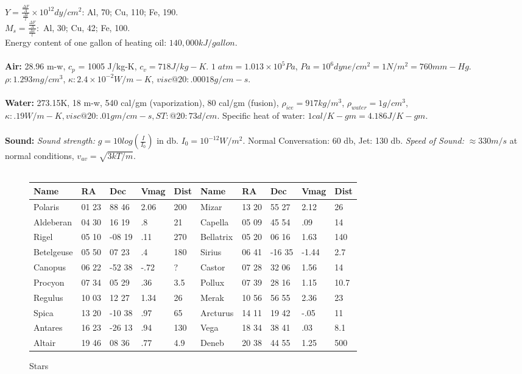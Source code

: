 $Y= {\frac {\frac {\Delta F}{A}} {\frac {\Delta l}{l}}} \times
10^{12} dy/cm^{2}$: Al, 70; Cu, 110; Fe, 190.  \\
$M_{s} = {\frac {\frac {\Delta F} {A}} {\frac {\Delta x} {l}}}:$
Al, 30; Cu, 42; Fe, 100.\\
Energy content of one gallon of heating oil: $140,000 kJ/gallon$.
\\
\\
{\bf Air:} 28.96 m-w, $c_{p}$ = 1005 J/kg-K, $c_{v} = 718 J/kg-K$.
$1\; atm= 1.013 \times 10^{5} Pa$, $Pa= 10^{6} dyne/cm^{2}= 1N/m^2=760 mm-Hg$.
$\rho: 1.293 mg/cm^{3}$, $\kappa :  2.4 \times 10^{-2} W/m-K$, $visc@20: .00018 g/cm-s.$
\\
\\
{\bf Water:} 273.15K, 18 m-w, 540 cal/gm (vaporization), 80 cal/gm (fusion),
$\rho_{ice} = 917 kg / m^{3}$,
$\rho_{water} = 1 g / cm^{3}$,
$\kappa:  .19 W/m-K, visc@20: .01gm/cm-s, ST: @20: 73d/cm.$  Specific
heat of water: $1 cal/K-gm= 4.186 J/K-gm$.
\\
\\
{\bf Sound:}
\emph{Sound strength:} $g= 10 log({\frac {I} {I_0}})$ in db.  $I_0 = 10^{-12}
W/m^2$. Normal Conversation: 60 db, Jet: 130 db.
\emph{Speed of Sound:}
$\approx 330 m/s$ at normal conditions,
$v_{av} = {\sqrt { {3 k T } / m }}$.
\\
\\
\begin{figure} [h]
\begin{center}
\begin{tabular} {|lllll|lllll|}
\hline
{\bf Name} & {\bf RA} & {\bf Dec} & {\bf Vmag} & {\bf Dist} & {\bf Name} & {\bf RA} & {\bf Dec} & {\bf Vmag} & {\bf Dist} \\
\hline
Polaris & 01 23 & 88 46 & 2.06 & 200 & Mizar & 13 20 & 55 27 & 2.12 & 26 \\
\hline
Aldeberan & 04 30 & 16 19 & .8 & 21 & Capella & 05 09 & 45 54 & .09 & 14 \\
\hline
Rigel & 05 10 & -08 19 & .11 & 270 & Bellatrix & 05 20 & 06 16 & 1.63 & 140 \\
\hline
Betelgeuse & 05 50 & 07 23 & .4 & 180 & Sirius & 06 41 & -16 35 & -1.44 & 2.7 \\
\hline
Canopus & 06 22 & -52 38 & -.72 & ? & Castor & 07 28 & 32 06 & 1.56 & 14 \\
\hline
Procyon & 07 34 & 05 29 & .36 & 3.5 & Pollux & 07 39 & 28 16 & 1.15 & 10.7 \\
\hline
Regulus & 10 03 & 12 27 & 1.34 & 26 & Merak & 10 56 & 56 55 & 2.36 & 23 \\
\hline
Spica & 13 20 & -10 38 & .97 & 65 & Arcturus & 14 11 & 19 42 & -.05 & 11 \\
\hline
Antares & 16 23 & -26 13 & .94 & 130 & Vega & 18 34 & 38 41 & .03 & 8.1 \\
\hline
Altair & 19 46 & 08 36 & .77 & 4.9 & Deneb & 20 38 & 44 55 & 1.25 & 500\\
\hline
\end{tabular}
\end{center}
\caption{Stars}
\end{figure}
